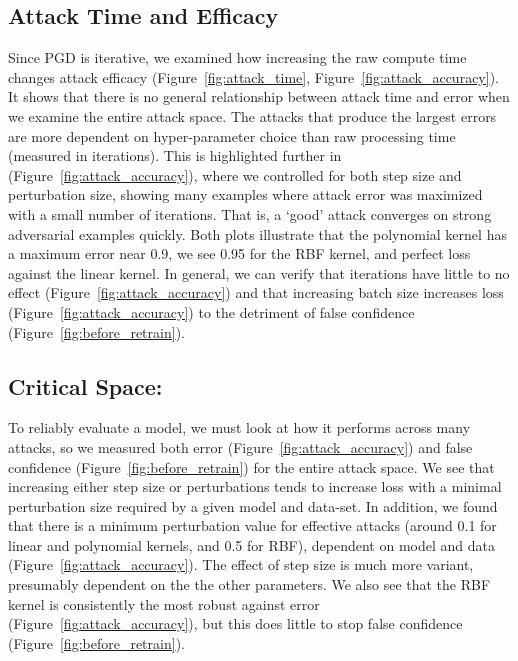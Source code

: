 \documentclass[runningheads]{llncs}
\begin{document}
\subsection{Attack Time and Efficacy}
Since PGD is iterative, we examined how increasing the raw compute time changes attack efficacy (Figure~\ref{fig:attack_time}, Figure~\ref{fig:attack_accuracy}). It shows that there is no general relationship between attack time and error when we examine the entire attack space. The attacks that produce the largest errors are more dependent on hyper-parameter choice than raw processing time (measured in iterations). This is highlighted further in (Figure~\ref{fig:attack_accuracy}), where we controlled for both step size and perturbation size, showing many examples where attack error was maximized with a small number of iterations. That is, a `good' attack converges on strong adversarial examples quickly. Both plots illustrate that the polynomial kernel has a maximum error near 0.9, we see 0.95 for the RBF kernel, and perfect loss against the linear kernel. In general, we can verify that iterations have little to no effect (Figure~\ref{fig:attack_accuracy})  and that increasing batch size increases loss (Figure~\ref{fig:attack_accuracy}) to the detriment of false confidence (Figure~\ref{fig:before_retrain}).


\subsection{Critical Space: }
To reliably evaluate a model, we must look at how it performs across many attacks, so we measured both error (Figure~\ref{fig:attack_accuracy}) and false confidence (Figure~\ref{fig:before_retrain}) for the entire attack space. We see that increasing either step size or perturbations tends to increase loss with a minimal perturbation size required by a given model and data-set. In addition, we found that there is a minimum perturbation value for effective attacks (around 0.1 for linear and polynomial kernels, and 0.5 for RBF), dependent on model and data (Figure~\ref{fig:attack_accuracy}). The effect of step size is much more variant, presumably dependent on the the other parameters. We also see that the RBF kernel is consistently the most robust against error (Figure~\ref{fig:attack_accuracy}), but this does little to stop false confidence (Figure~\ref{fig:before_retrain}). 
\end{document}
